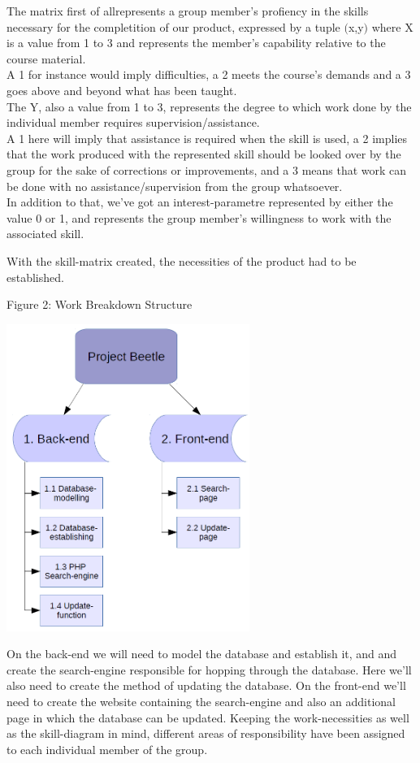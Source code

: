 \documentclass[12pt,a4paper]{article}
\begin{document}
The matrix first of allrepresents a group member's profiency in the skills necessary for the completition of our product, expressed by a tuple $($x,y$)$ where X is a value from 1 to 3 and represents the member's capability relative to the course material.\\
A 1 for instance would imply difficulties, a 2 meets the course's demands and a 3 goes above and beyond what has been taught.\\
The Y, also a value from 1 to 3, represents the degree to which work done by the individual member requires supervision/assistance. \\
A 1 here will imply that assistance is required when the skill is used, a 2 implies that the work produced with the represented skill should be looked over by the group for the sake of corrections or improvements, and a 3 means that work can be done with no assistance/supervision from the group whatsoever.\\
In addition to that, we've got an interest-parametre represented by either the value 0 or 1, and represents the group member's willingness to work with the associated skill.

With the skill-matrix created, the necessities of the product had to be established.
\\
\newpage
\begin{center}
	Figure 2: Work Breakdown Structure
	
\includegraphics[height=100mm]{WorkBreakdownStructure.png}
\end{center}

On the back-end we will need to model the database and establish it, and and create the search-engine responsible for hopping through the database. Here we'll also need to create the method of updating the database.
On the front-end we'll need to create the website containing the search-engine and also an additional page in which the database can be updated.
Keeping the work-necessities as well as the skill-diagram in mind, different areas of responsibility have been assigned to each individual member of the group.
\end{document}
